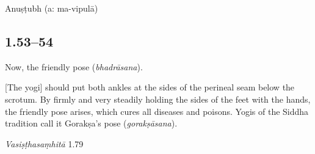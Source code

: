 \begin{ekdosis}
\begin{metre}[hp01_051]
Anuṣṭubh (a: ma-vipulā)
\end{metre}







\subsection*{1.53--54}
\begin{translation}[hp01_053]
Now, the friendly pose (\emph{bhadrāsana}).

[The yogi] should put both ankles at the sides of the perineal seam below the scrotum.  By firmly and very steadily holding the sides of the feet with the hands, the friendly pose arises, which cures all diseases and poisons. Yogis of the Siddha tradition call it Gorakṣa's pose (\emph{gorakṣāsana}).
\end{translation}

\begin{sources}[hp01_053]
\emph{Vasiṣṭhasaṃhitā} 1.79

\begin{versinnote}
\end{versinnote}


\end{sources}
\end{ekdosis}
